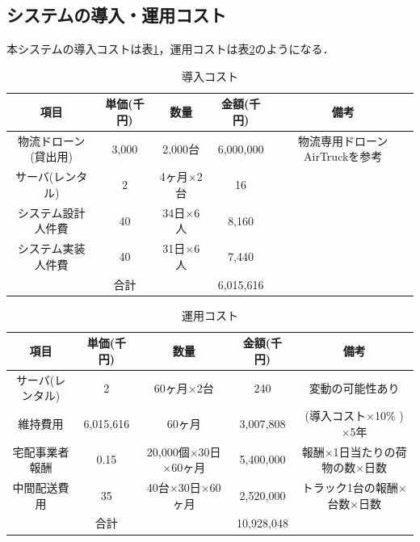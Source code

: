 \documentclass[a4paper, titlepage]{jsarticle}
\begin{document}
\subsection{システムの導入・運用コスト}
本システムの導入コストは表\ref{tab:label1}，運用コストは表\ref{tab:label2}のようになる．
\begin{table}[H]
  \centering
  \caption{導入コスト}
  \begin{tabular}{c c c c c}
    \hline
    項目          & 単価(千円) & 数量            & 金額(千円)    & 備考                                           \\
    \hline \hline
    物流ドローン(貸出用) & 3,000  & 2,000台        & 6,000,000 & 物流専用ドローン AirTruck\cite{aeronext_airtruck}を参考 \\
    サーバ(レンタル)   & 2      & 4ヶ月$\times$2台 & 16        &                                              \\
    システム設計人件費   & 40     & 34日$\times$6人 & 8,160     &                                              \\
    システム実装人件費   & 40     & 31日$\times$6人 & 7,440     &                                              \\
    \hline \hline
                & 合計     &               & 6,015,616 &                                              \\
    \hline
  \end{tabular}
  \label{tab:label1}
\end{table}

\begin{table}[H]
  \centering
  \caption{運用コスト}
  \begin{tabular}{c c c c c}
    \hline
    項目        & 単価(千円)    & 数量                             & 金額(千円)     & 備考                             \\
    \hline \hline
    サーバ(レンタル) & 2         & 60ヶ月$\times$2台                 & 240        & 変動の可能性あり                       \\
    維持費用      & 6,015,616 & 60ヶ月                           & 3,007,808  & (導入コスト$\times$10\% )$\times$5年 \\
    宅配事業者報酬   & 0.15      & 20,000個$\times$30日$\times$60ヶ月 & 5,400,000  & 報酬$\times$1日当たりの荷物の数$\times$日数 \\
    中間配送費用    & 35        & 40台$\times$30日$\times$60ヶ月     & 2,520,000  & トラック1台の報酬$\times$台数$\times$日数  \\
    \hline \hline
              & 合計        &                                & 10,928,048 &                                \\
    \hline
  \end{tabular}
  \label{tab:label2}
\end{table}
\end{document}
